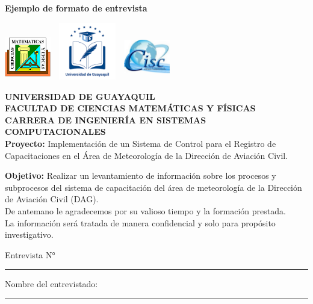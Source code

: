 \documentclass[12pt, a4paper, nofontenc, numbers=endperiod]{apa7}
\begin{document}
{\begin{center}
	\textbf{Ejemplo de formato de entrevista}
\end{center}

\includegraphics[width=2cm,height=2cm]{Imagenes/Figura14}
\hspace*{4cm}	\includegraphics[width=3cm,height=2.5cm]{Imagenes/Figura1}
\hspace*{3.7cm}	\includegraphics[width=2cm,height=2cm]{Imagenes/Figura15}

{\centering
	\textbf{ UNIVERSIDAD DE GUAYAQUIL} \\[-0.1cm]
	\textbf{ FACULTAD DE CIENCIAS MATEMÁTICAS Y FÍSICAS} \\ [-0.1cm]
	\textbf{ CARRERA DE INGENIERÍA EN SISTEMAS COMPUTACIONALES} \\ [0.5cm]
}
\setlength{\parindent}{0cm}\textbf{Proyecto:} Implementación de un Sistema de Control para el Registro de Capacitaciones en el Área de Meteorología de la Dirección de Aviación Civil.

\setlength{\parindent}{0cm}\textbf{Objetivo:} Realizar un levantamiento de información
sobre los procesos y subprocesos del sistema de capacitación del área de meteorología de la Dirección de Aviación Civil (DAG).\\
De antemano le agradecemos por su valioso tiempo y la formación prestada.\\
La información será tratada de manera confidencial y solo para propósito investigativo.
\begin{flushright}
	Entrevista N°\rule[0mm]{5mm}{0.1mm}
\end{flushright}	

\setlength{\parindent}{0cm}Nombre del entrevistado:	\\
\rule[0mm]{160mm}{0.1mm}	

}
\end{document}
